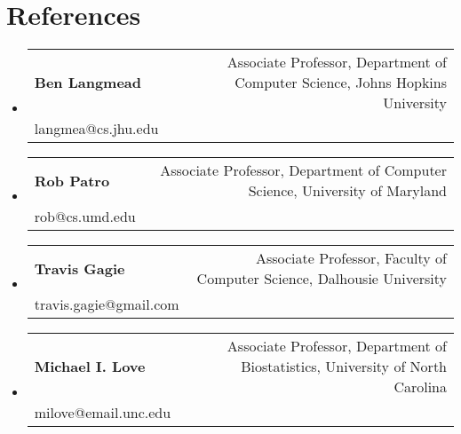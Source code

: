 \documentclass[A4,11pt]{article}
\makeatletter
\newcommand{\CVSubheading}[4]{
  \vspace{-2pt}\item
    \begin{tabular*}{0.97\textwidth}[t]{l@{\extracolsep{\fill}}r}
      \textbf{#1} & #2 \\
      \small#3 & \small #4 \\
    \end{tabular*}\vspace{-7pt}
}
\newcommand{\CVSubHeadingListStart}{\begin{itemize}[leftmargin=0.5cm, label={}]}
\newcommand{\CVSubHeadingListEnd}{\end{itemize}}
\makeatother
\begin{document}

\section{References}
\CVSubHeadingListStart
  \CVSubheading
    {Ben Langmead}{Associate Professor, Department of Computer Science, Johns Hopkins University}
    {langmea@cs.jhu.edu}{}
  \CVSubheading
    {Rob Patro}{Associate Professor, Department of Computer Science, University of Maryland}
    {rob@cs.umd.edu}{ }
\CVSubheading
    {Travis Gagie}{Associate Professor, Faculty of Computer Science, Dalhousie University}
    {travis.gagie@gmail.com}{ }
\CVSubheading
    {Michael I. Love}{Associate Professor, Department of Biostatistics, University of North Carolina}
    {milove@email.unc.edu}{ }
\CVSubHeadingListEnd
\end{document}
